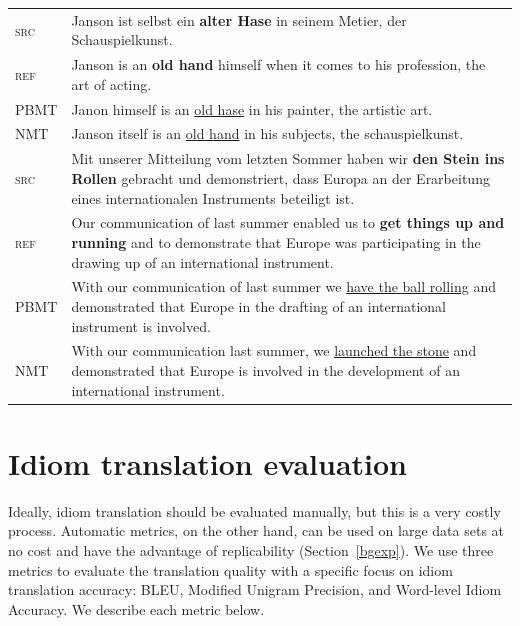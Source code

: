 \begin{table}[htbp]
\begin{center}
\begin{tabularx}{0.95\linewidth}{lX}
              \midrule
 \textsc{src} & Janson ist selbst ein \textbf{alter Hase} in seinem Metier, der Schauspielkunst.   \\
       \textsc{ref} &   Janson is an \textbf{old hand} himself when it comes to his profession, the art of acting.  \\
       PBMT  &   Janon himself is an \underline{old hase} in his painter, the artistic art.  \\
       NMT  &    Janson itself is an \underline{old hand} in his subjects, the schauspielkunst.   \\
       \midrule
     \textsc{src} &   Mit unserer Mitteilung vom letzten Sommer haben wir \textbf{den Stein ins Rollen} gebracht und demonstriert, dass Europa an der Erarbeitung eines internationalen Instruments beteiligt ist. \\
       \textsc{ref} & Our communication of last summer enabled us to \textbf{get things up and running} and to demonstrate that Europe was participating in the drawing up of an international instrument. \\
       PBMT  &    With our communication of last summer we \underline{have the ball rolling} and demonstrated that Europe in the drafting of an international instrument is involved. \\
       NMT  &   With our communication last summer, we \underline{launched the stone} and demonstrated that Europe is involved in the development of an international instrument. \\
\bottomrule
 \end{tabularx}
 \end{center}
 \end{table}
 
\section{Idiom translation evaluation} \label{idevalus}

Ideally, idiom translation should be evaluated manually, but this is a very costly process.
Automatic metrics, on the other hand, can be used on large data sets at no cost and have the advantage of replicability (Section~\ref{bgexp}).
We use three metrics to evaluate the translation quality with a specific focus on idiom translation accuracy: BLEU, Modified Unigram Precision, and Word-level Idiom Accuracy. We describe each metric below.

